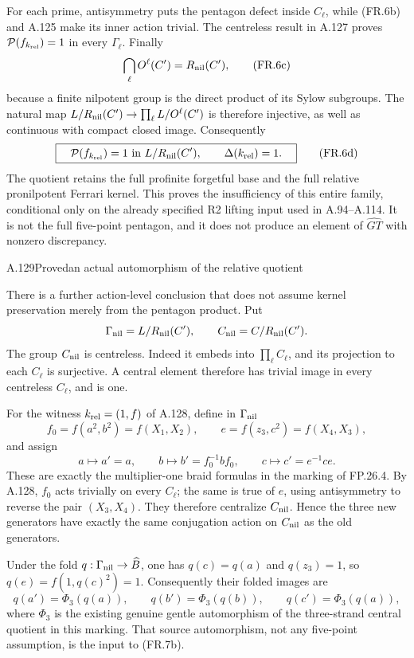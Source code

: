 For each prime, antisymmetry puts the pentagon defect inside
$C_\ell$, while (FR.6b) and A.125 make its inner action trivial.
The centreless result in A.127 proves
$\mathcal P(f_{k_{\rm rel}})=1$ in every $\Gamma_\ell$.
Finally
\[
       \bigcap_\ell O^\ell(C')=R_{\rm nil}(C'),
 \tag{FR.6c}
\]
because a finite nilpotent group is the direct product of its
Sylow subgroups. The natural map
$L/R_{\rm nil}(C')\to\prod_\ell L/O^\ell(C')$ is therefore
injective, as well as continuous with compact closed image.
Consequently
\[
 \boxed{\quad\mathcal P(f_{k_{\rm rel}})=1
           \text{ in }L/R_{\rm nil}(C'),\qquad
           \Delta(k_{\rm rel})=1.\quad}
 \tag{FR.6d}
\]
The quotient retains the full profinite forgetful base and
the full relative pronilpotent Ferrari kernel. This proves
the insufficiency of this entire family, conditional only
on the already specified R2 lifting input used in A.94--A.114.
It is not the full five-point pentagon, and it does not
produce an element of $\widehat{GT}$ with nonzero discrepancy.

\begin{statement}{A.129}{Proved}{an actual automorphism of the relative quotient}
\end{statement}
There is a further action-level conclusion that does not assume
kernel preservation merely from the pentagon product. Put
\[
 \Gamma_{\rm nil}=L/R_{\rm nil}(C'),\qquad
 C_{\rm nil}=C/R_{\rm nil}(C').
\]
The group $C_{\rm nil}$ is centreless. Indeed it embeds into
$\prod_\ell C_\ell$, and its projection to each $C_\ell$
is surjective. A central element therefore has trivial image
in every centreless $C_\ell$, and is one.

For the witness $k_{\rm rel}=(1,f)$ of A.128, define in
$\Gamma_{\rm nil}$
\[
 f_0=f(a^2,b^2)=f(X_1,X_2),\qquad
 e=f(z_3,c^2)=f(X_4,X_3),
\]
and assign
\[
       a\longmapsto a'=a,\qquad
       b\longmapsto b'=f_0^{-1}bf_0,\qquad
       c\longmapsto c'=e^{-1}ce.
 \tag{FR.7a}
\]
These are exactly the multiplier-one braid formulas in
the marking of FP.26.4. By A.128, $f_0$ acts trivially on
every $C_\ell$; the same is true of $e$, using antisymmetry
to reverse the pair $(X_3,X_4)$. They therefore centralize
$C_{\rm nil}$. Hence the three new generators have exactly
the same conjugation action on $C_{\rm nil}$ as the old
generators.

Under the fold $q:\Gamma_{\rm nil}\to\widehat B$, one has
$q(c)=q(a)$ and $q(z_3)=1$, so $q(e)=f(1,q(c)^2)=1$.
Consequently their folded images are
\[
 q(a')=\Phi_3(q(a)),\qquad
 q(b')=\Phi_3(q(b)),\qquad
 q(c')=\Phi_3(q(a)),
 \tag{FR.7b}
\]
where $\Phi_3$ is the existing genuine gentle automorphism
of the three-strand central quotient in this marking.
That source automorphism, not any five-point assumption,
is the input to (FR.7b).

